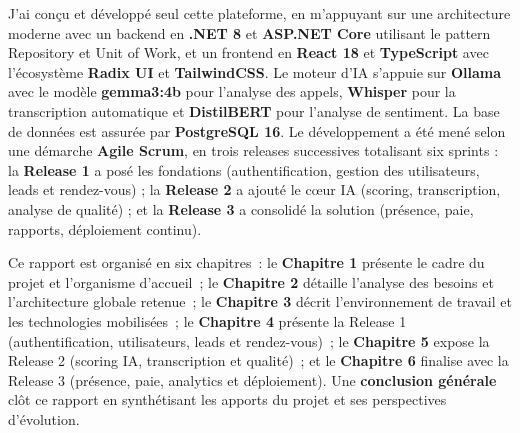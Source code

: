 J'ai conçu et développé seul cette plateforme, en m'appuyant sur une
architecture moderne avec un backend en \textbf{.NET 8} et \textbf{ASP.NET
Core} utilisant le pattern Repository et Unit of Work, et un frontend en
\textbf{React 18} et \textbf{TypeScript} avec l'écosystème \textbf{Radix UI}
et \textbf{TailwindCSS}. Le moteur d'IA s'appuie sur \textbf{Ollama} avec le
modèle \textbf{gemma3:4b} pour l'analyse des appels, \textbf{Whisper} pour la
transcription automatique et \textbf{DistilBERT} pour l'analyse de sentiment.
La base de données est assurée par \textbf{PostgreSQL 16}. Le développement a
été mené selon une démarche \textbf{Agile Scrum}, en trois releases
successives totalisant six sprints : la \textbf{Release 1} a posé les
fondations (authentification, gestion des utilisateurs, leads et rendez-vous)
; la \textbf{Release 2} a ajouté le cœur IA (scoring, transcription, analyse
de qualité) ; et la \textbf{Release 3} a consolidé la solution (présence,
paie, rapports, déploiement continu).

Ce rapport est organisé en six chapitres~: le \textbf{Chapitre 1} présente
le cadre du projet et l'organisme d'accueil~; le \textbf{Chapitre 2} détaille
l'analyse des besoins et l'architecture globale retenue~; le \textbf{Chapitre
3} décrit l'environnement de travail et les technologies mobilisées~; le
\textbf{Chapitre 4} présente la Release 1 (authentification, utilisateurs,
leads et rendez-vous)~; le \textbf{Chapitre 5} expose la Release 2 (scoring IA,
transcription et qualité)~; et le \textbf{Chapitre 6} finalise avec la Release 3
(présence, paie, analytics et déploiement). Une \textbf{conclusion générale}
clôt ce rapport en synthétisant les apports du projet et ses perspectives
d'évolution.
